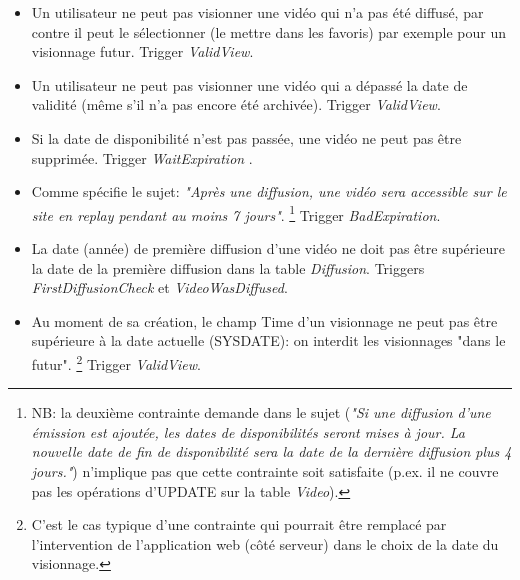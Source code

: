 \documentclass[twoside,openright,a4paper,11pt,french]{article}
\begin{document}
\begin{itemize}
\item Un utilisateur ne peut pas visionner une vidéo qui n'a pas été diffusé,
par contre il peut le sélectionner (le mettre dans les favoris) par exemple
pour un visionnage futur. Trigger {\it ValidView}.

\item Un utilisateur ne peut pas visionner une vidéo qui a dépassé la date de
validité (même s'il n'a pas encore été archivée). Trigger {\it ValidView}.

\item Si la date de disponibilité n'est pas passée, une vidéo ne peut pas être supprimée. 
      Trigger {\it WaitExpiration }.

\item Comme spécifie le sujet: {\it "Après une diffusion, une vidéo sera
accessible sur le site en replay pendant au moins 7 jours"}. 
\footnote{NB: la deuxième contrainte demande dans le sujet ({\it"Si une diffusion d’une émission est
ajoutée, les dates de disponibilités seront mises à jour.  La nouvelle date de
fin de disponibilité sera la date de la dernière diffusion plus 4 jours."})
n'implique pas que cette contrainte soit satisfaite (p.ex. il ne couvre pas les
opérations d'UPDATE sur la table {\it Video}).} 
Trigger {\it BadExpiration}.

\item La date (année) de première diffusion d'une vidéo ne doit pas être
supérieure la date de la première diffusion dans la table {\it Diffusion}.
Triggers {\it FirstDiffusionCheck} et {\it VideoWasDiffused}.

\item  Au moment de sa création, le champ Time d'un visionnage ne peut pas être
supérieure à la date actuelle (SYSDATE): on interdit les visionnages "dans le
futur".
\footnote{C'est le cas typique d'une contrainte qui pourrait être remplacé par
l'intervention de l'application web (côté serveur) dans le choix de la date du
visionnage.}
Trigger {\it ValidView}.



\end{itemize}

\end{document}
